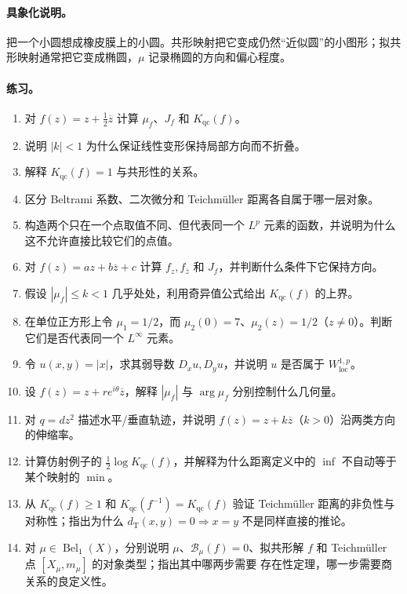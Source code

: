 \documentclass[UTF8,fontset=none,a4paper,11pt]{ctexart}
\theoremstyle{foundation-definition}
\theoremstyle{foundation-theorem}
\theoremstyle{foundation-proposition}
\theoremstyle{foundation-example}
\theoremstyle{foundation-remark}
\theoremstyle{foundation-theorem}
\begin{document}
\paragraph{具象化说明。}
把一个小圆想成橡皮膜上的小圆。共形映射把它变成仍然“近似圆”的小图形；拟共形映射通常把它变成椭圆，\(\mu\) 记录椭圆的方向和偏心程度。

\paragraph{练习。}
\begin{enumerate}[label=M9.\arabic*.]
  \item 对 \(f(z)=z+\frac12\overline z\) 计算 \(\mu_f\)、\(J_f\) 和 \(K_{\mathrm{qc}}(f)\)。
  \item 说明 \(|k|<1\) 为什么保证线性变形保持局部方向而不折叠。
  \item 解释 \(K_{\mathrm{qc}}(f)=1\) 与共形性的关系。
  \item 区分 Beltrami 系数、二次微分和 Teichmüller 距离各自属于哪一层对象。
  \item 构造两个只在一个点取值不同、但代表同一个 \(L^p\) 元素的函数，并说明为什么这不允许直接比较它们的点值。
  \item 对 \(f(z)=az+b\overline z+c\) 计算 \(f_z,f_{\bar z}\) 和 \(J_f\)，并判断什么条件下它保持方向。
  \item 假设 \(|\mu_f|\leq k<1\) 几乎处处，利用奇异值公式给出 \(K_{\mathrm{qc}}(f)\) 的上界。
  \item 在单位正方形上令 \(\mu_1=1/2\)，而 \(\mu_2(0)=7\)、\(\mu_2(z)=1/2\)（\(z\neq0\)）。判断它们是否代表同一个 \(L^\infty\) 元素。
  \item 令 \(u(x,y)=|x|\)，求其弱导数 \(D_xu,D_yu\)，并说明 \(u\) 是否属于 \(W^{1,p}_{\mathrm{loc}}\)。
  \item 设 \(f(z)=z+re^{i\theta}\overline z\)，解释 \(|\mu_f|\) 与 \(\arg\mu_f\) 分别控制什么几何量。
  \item 对 \(q=dz^2\) 描述水平/垂直轨迹，并说明 \(f(z)=z+k\overline z\)（\(k>0\)）沿两类方向的伸缩率。
  \item 计算仿射例子的 \(\frac12\log K_{\mathrm{qc}}(f)\)，并解释为什么距离定义中的 \(\inf\) 不自动等于某个映射的 \(\min\)。
  \item 从 \(K_{\mathrm{qc}}(f)\geq1\) 和 \(K_{\mathrm{qc}}(f^{-1})=K_{\mathrm{qc}}(f)\) 验证 Teichmüller 距离的非负性与对称性；指出为什么 \(d_{\mathrm T}(x,y)=0\Rightarrow x=y\) 不是同样直接的推论。
  \item 对 \(\mu\in\operatorname{Bel}_1(X)\)，分别说明
    \(\mu\)、\(\mathcal B_\mu(f)=0\)、拟共形解 \(f\) 和
    Teichmüller 点 \([X_\mu,m_\mu]\) 的对象类型；指出其中哪两步需要
    存在性定理，哪一步需要商关系的良定义性。
\end{enumerate}
\end{document}
